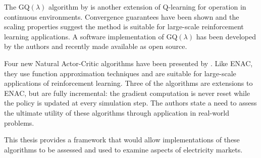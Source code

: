 The GQ$(\lambda)$ algorithm by  is another extension of Q-learning
for operation in continuous environments.  Convergence guarantees have been
shown and the scaling properties suggest the method is suitable for large-scale
reinforcement learning applications.  A software implementation of GQ$(\lambda)$
has been developed by the authors and recently made available as open source.

Four new Natural Actor-Critic algorithms have been presented by
. Like ENAC, they use function
approximation techniques and are suitable for large-scale applications of reinforcement learning.  Three
of the algorithms are extensions to ENAC, but are fully
incremental: the gradient computation is never reset while the policy is updated
at every simulation step.  The authors state a need to assess the ultimate
utility of these algorithms through application in real-world problems.

This thesis provides a framework that would allow implementations of these
algorithms to be assessed and used to examine aspects of electricity
markets.

